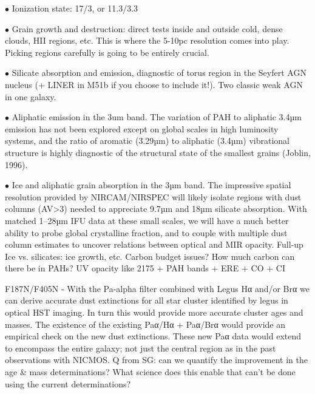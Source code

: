 \documentclass[12pt]{article}
\begin{document}
\noindent $\bullet$ Ionization state: 17/3, or 11.3/3.3

\noindent $\bullet$ Grain growth and destruction: direct tests inside and outside cold, dense clouds, HII regions, etc.  This is where the 5-10pc resolution comes into play.  Picking regions carefully is going to be entirely crucial.

\noindent $\bullet$ Silicate absorption and emission, diagnostic of torus region in the Seyfert AGN nucleus (+ LINER in M51b if you choose to include it!).  Two classic weak AGN in one galaxy.

\noindent $\bullet$ Aliphatic emission in the 3um band.  The variation of PAH to aliphatic 3.4µm emission has not been explored except on global scales in high luminosity systems, and the ratio of aromatic (3.29µm) to aliphatic (3.4µm) vibrational structure is highly diagnostic of the structural state of the smallest grains (Joblin, 1996).

\noindent $\bullet$ Ice and aliphatic grain absorption in the 3µm band.  The impressive spatial resolution provided by NIRCAM/NIRSPEC will likely isolate regions with dust columns (AV>3) needed to appreciate 9.7µm and 18µm silicate absorption.  With matched 1–28µm IFU data at these small scales, we will have a much better ability to probe global crystalline fraction, and to couple with multiple dust column estimates to uncover relations between optical and MIR opacity.  Full-up Ice vs. silicates: ice growth, etc. 
Carbon budget issues?  How much carbon can there be in PAHs?  UV opacity like 2175 + PAH bands + ERE + CO + CI

\vspace{0.1in}


F187N/F405N - With the Pa-alpha filter combined with Legus Hα and/or Brα we can derive accurate dust extinctions for all star cluster identified by legus in optical HST imaging. In turn this would provide more accurate cluster ages and masses. The existence of the existing Paα/Ηα + Paα/Brα would provide an empirical check on the new dust extinctions. These new Paα data would extend to encompass the entire galaxy; not just the central region as in the past observations with NICMOS.
Q from SG: can we quantify the improvement in the age \& mass determinations? What science does this enable that can’t be done using the current determinations?
\end{document}
